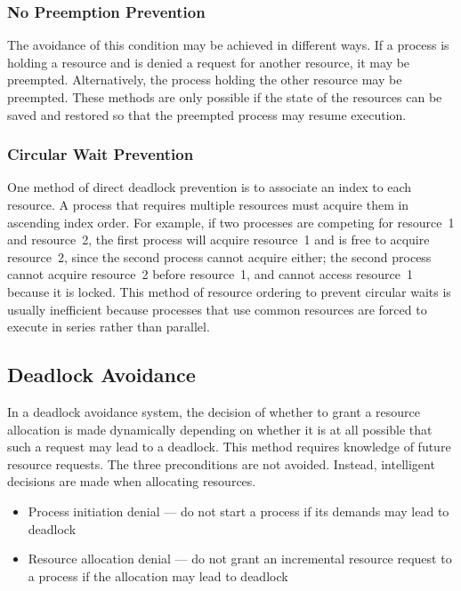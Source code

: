 \subsubsection{No Preemption Prevention}

The avoidance of this condition may be achieved in different ways.
If a process is holding a resource and is denied a request for another resource, it may be preempted.
Alternatively, the process holding the other resource may be preempted.
These methods are only possible if the state of the resources can be saved and restored so that the preempted process may resume execution.

\subsubsection{Circular Wait Prevention}

One method of direct deadlock prevention is to associate an index to each resource.
A process that requires multiple resources must acquire them in ascending index order.
For example, if two processes are competing for resource~1 and resource~2, the first process will acquire resource~1 and is free to acquire resource~2, since the second process cannot acquire either; the second process cannot acquire resource~2 before resource~1, and cannot access resource~1 because it is locked.
This method of resource ordering to prevent circular waits is usually inefficient because processes that use common resources are forced to execute in series rather than parallel.

\subsection{Deadlock Avoidance}

In a deadlock avoidance system, the decision of whether to grant a resource allocation is made dynamically depending on whether it is at all possible that such a request may lead to a deadlock.
This method requires knowledge of future resource requests.
The three preconditions are not avoided.
Instead, intelligent decisions are made when allocating resources.

\begin{itemize}
  \item Process initiation denial --- do not start a process if its demands may lead to deadlock
  \item Resource allocation denial --- do not grant an incremental resource request to a process if the allocation may lead to deadlock
\end{itemize}

